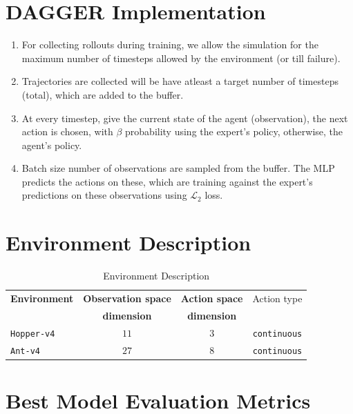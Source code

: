 \section{DAGGER Implementation}
\begin{enumerate}
\item 
For collecting rollouts during training, we allow the simulation for the maximum number of timesteps allowed by the environment (or till failure).
\item Trajectories are collected will be have atleast a target number of timesteps (total), which are added to the buffer.
\item
At every timestep, give the current state of the agent (observation), the next action is chosen, with $\beta$ probability using the expert's policy, otherwise, the agent's policy.

\item Batch size number of observations are sampled from the buffer. The MLP predicts the actions on these, which are training against the expert's predictions on these observations using $\mathcal{L}_2$ loss.
\end{enumerate}

\section{Environment Description}
\begin{table}[H]
\centering
\begin{tabular}{lccc}
\hline
\textbf{Environment} &\textbf{Observation space}& \textbf{Action space} & {Action type} \\
&\textbf{dimension}& \textbf{dimension} &  \\
\hline
\texttt{Hopper-v4} & $11$ & $3$ & \texttt{continuous}\\
\texttt{Ant-v4}    & $27$ & $8$ & \texttt{continuous}\\
\hline
\end{tabular}
\caption{Environment Description}
\label{tab:environment_description}
\end{table}

\section{Best Model Evaluation Metrics}
